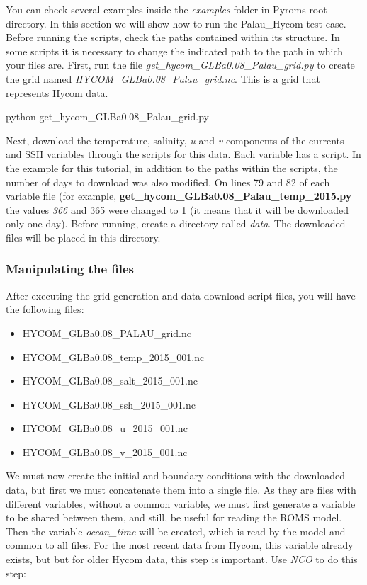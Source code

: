 \noindent You can check several examples inside the \textit{examples} folder in Pyroms root directory. In this section 
we will show how to run the Palau\_Hycom test case. Before running the scripts, check the paths contained within its structure. 
In some scripts it is necessary to change the indicated path to the path in which your files are. First, run the file \textit{get\_hycom\_GLBa0.08\_Palau\_grid.py}
to create the grid named \textit{HYCOM\_GLBa0.08\_Palau\_grid.nc}. This is a grid that represents Hycom data.
\bigskip

\begin{bashcode}
python get_hycom_GLBa0.08_Palau_grid.py
\end{bashcode}
\bigskip

\noindent Next, download the temperature, salinity, \textit{u} and \textit{v} components of the currents and SSH variables 
through the scripts for this data. Each variable has a script. In the example for this tutorial, in addition to the paths within the scripts, the number of days 
to download was also modified. On lines 79 and 82 of each variable file (for example, \textbf{get\_hycom\_GLBa0.08\_Palau\_temp\_2015.py} the values \textit{366} and
365 were changed to 1 (it means that it will be downloaded only one day). Before running, create a directory called \textit{data}. The downloaded files will be placed in
this directory.
\bigskip

\subsubsection{Manipulating the files}
\bigskip

\noindent After executing the grid generation and data download script files, you will have the following files:
\bigskip

\begin{itemize}
    \item HYCOM\_GLBa0.08\_PALAU\_grid.nc
    \item HYCOM\_GLBa0.08\_temp\_2015\_001.nc
    \item HYCOM\_GLBa0.08\_salt\_2015\_001.nc
    \item HYCOM\_GLBa0.08\_ssh\_2015\_001.nc   
    \item HYCOM\_GLBa0.08\_u\_2015\_001.nc
    \item HYCOM\_GLBa0.08\_v\_2015\_001.nc    
\end{itemize}
\bigskip

\noindent We must now create the initial and boundary conditions with the downloaded data, but first we must concatenate them into a single file. 
As they are files with different variables, without a common variable, we must first generate a variable to be shared between them, and still, be useful 
for reading the ROMS model. Then the variable \textit{ocean\_time} will be created, which is read by the model and common to all files.
For the most recent data from Hycom, this variable already exists, but but for older Hycom data, this step is important. Use \textit{NCO} to do this step:
\bigskip

